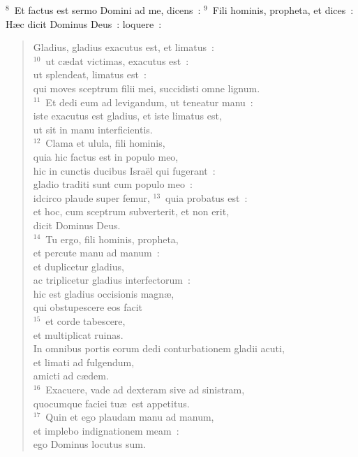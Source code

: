 ${}^{8}$~Et factus est sermo Domini ad me, dicens~:
${}^{9}$~Fili hominis, propheta, et dices~: H\ae c dicit Dominus Deus~: loquere~: \begin{verse}Gladius, gladius exacutus est, et limatus~:\\
${}^{10}$~ut c\ae dat victimas, exacutus est~:\\ ut splendeat, limatus est~:\\ qui moves sceptrum filii mei, succidisti omne lignum.\\
${}^{11}$~Et dedi eum ad levigandum, ut teneatur manu~:\\ iste exacutus est gladius, et iste limatus est,\\ ut sit in manu interficientis.\\
${}^{12}$~Clama et ulula, fili hominis,\\ quia hic factus est in populo meo,\\ hic in cunctis ducibus Isra\"el qui fugerant~:\\ gladio traditi sunt cum populo meo~:\\ idcirco plaude super femur,
${}^{13}$~quia probatus est~:\\ et hoc, cum sceptrum subverterit, et non erit,\\ dicit Dominus Deus.\\
${}^{14}$~Tu ergo, fili hominis, propheta,\\ et percute manu ad manum~:\\ et duplicetur gladius,\\ ac triplicetur gladius interfectorum~:\\ hic est gladius occisionis magn\ae ,\\ qui obstupescere eos facit\\
${}^{15}$~et corde tabescere,\\ et multiplicat ruinas.\\ In omnibus portis eorum dedi conturbationem gladii acuti,\\ et limati ad fulgendum,\\ amicti ad c\ae dem.\\
${}^{16}$~Exacuere, vade ad dexteram sive ad sinistram,\\ quocumque faciei tu\ae\ est appetitus.\\
${}^{17}$~Quin et ego plaudam manu ad manum,\\ et implebo indignationem meam~:\\ ego Dominus locutus sum.\end{verse}


